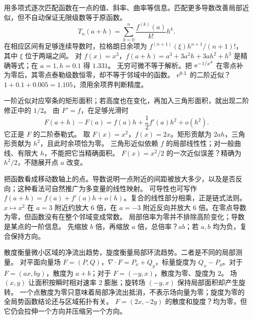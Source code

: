 \idea 用多项式逐次匹配函数在一点的值、斜率、曲率等信息。匹配更多导数改善局部近似，但不自动保证无限级数等于原函数。
\mathpart
\[T_n(a+h)=\sum_{k=0}^n\frac{f^{(k)}(a)}{k!}h^k.\]
在相应区间有足够连续导数时，拉格朗日余项为 $f^{(n+1)}(\xi)h^{n+1}/(n+1)!$，其中 $\xi$ 位于两端之间。
\examplepart 对 $f(x)=x^3$，$f(a+h)=a^3+3a^2h+3ah^2+h^3$ 是精确等式；在 $a=1,h=0.1$ 得 $1.331$。
\pitfall 无穷可微不等于解析。把 $\mathrm e^{-1/x^2}$ 在零点补为零后，其零点泰勒级数恒零，却不等于邻域中的函数。
\exercise $\mathrm e^{0.1}$ 的二阶近似？$1+0.1+0.005=1.105$，须用余项界判断精度。
\nextlesson

\idea 一阶近似对应窄条的矩形面积；若高度也在变化，再加入三角形面积，就出现二阶修正中的 $1/2$。
\mathpart 由 $F'=f$，在足够光滑时
\[F(a+h)-F(a)=f(a)h+\frac12f'(a)h^2+o(h^2).\]
它正是 $F$ 的二阶泰勒式。
\examplepart 取 $F(x)=x^2$，$f(x)=2x$。矩形贡献为 $2ah$，三角形贡献为 $h^2$，且此时余项恰为零。
\pitfall 三角形近似依赖 $f$ 的局部线性性；对一般曲线、有限大 $h$，不能把它当精确面积。
\exercise $F(x)=x^2/2$ 的一次近似误差？精确为 $h^2/2$，不随展开点 $a$ 改变。
\nextlesson

\idea 把函数看成移动数轴上的点。导数说明一点附近的间距被放大多少，以及是否反向；这种看法可自然推广为多变量的线性映射。
\mathpart 可导性也可写作 $f(a+h)=f(a)+f'(a)h+o(h)$。复合的线性部分相乘，正是链式法则。
\examplepart $x\mapsto x^2$ 在 $a=3$ 附近约放大 $6$ 倍，在 $a=-3$ 附近反向并放大 $6$ 倍。在零点导数为零，但函数没有在整个邻域变成常数。
\pitfall 局部倍率为零并不排除高阶变化；导数是某点的一阶信息。
\exercise 先缩放 $b$ 倍，再缩放 $a$ 倍，总倍率？$ab$；若 $a,b$ 均为负，复合保持方向。
\nextlesson

\idea 散度衡量微小区域的净流出趋势，旋度衡量局部环流趋势。二者是不同的局部测量。
\mathpart 对平面向量场 $F=(P,Q)$，$\nabla\cdot F=P_x+Q_y$，标量旋度为 $Q_x-P_y$。对于 $F=(ax,by)$，散度为 $a+b$；对于 $F=(-y,x)$，散度为零、旋度为 $2$。
\examplepart 场 $(x,y)$ 让面积按瞬时相对速率 $2$ 膨胀；旋转场 $(-y,x)$ 保持局部面积却产生旋转。
\pitfall 一个点散度为零只意味着局部净流出抵消，不表示场向量为零；旋度为零的全局势函数结论还与区域拓扑有关。
\exercise $F=(2x,-2y)$ 的散度和旋度？均为零，但它仍会拉伸一个方向并压缩另一个方向。
